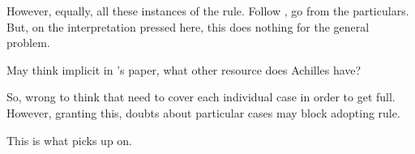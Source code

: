 \begin{note}
  However, equally, all these instances of the rule.
  Follow \textcite{Wisdom:1974uc}, go from the particulars.
  But, on the interpretation pressed here, this does nothing for the general problem.

  May think implicit in \citeauthor{Carroll:1895uj}'s paper, what other resource does Achilles have?
\end{note}


\begin{note}
  So, wrong to think that need to cover each individual case in order to get full.
  However, granting this, doubts about particular cases may block adopting rule.

  This is what \qzS{} picks up on.
\end{note}

